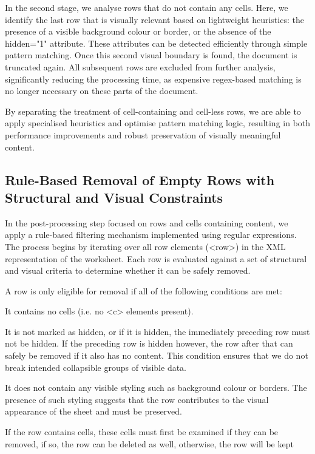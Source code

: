 In the second stage, we analyse rows that do not contain any cells.
Here, we identify the last row that is visually relevant based on lightweight heuristics:
the presence of a visible background colour or border,
or the absence of the hidden="1" attribute.
These attributes can be detected efficiently through simple pattern matching.
Once this second visual boundary is found, the document is truncated again.
All subsequent rows are excluded from further analysis,
significantly reducing the processing time,
as expensive regex-based matching is no longer necessary on these parts of the document.

By separating the treatment of cell-containing and cell-less rows,
we are able to apply specialised heuristics and optimise pattern matching logic,
resulting in both performance improvements
and robust preservation of visually meaningful content.

\subsection{Rule-Based Removal of Empty Rows with Structural and Visual Constraints}

In the post-processing step focused on rows and cells containing content,
we apply a rule-based filtering mechanism implemented using regular expressions.
The process begins by iterating over all row elements (<row>)
in the XML representation of the worksheet.
Each row is evaluated against a set of structural and visual criteria
to determine whether it can be safely removed.

A row is only eligible for removal if all of the following conditions are met:

It contains no cells (i.e. no <c> elements present).

It is not marked as hidden, or if it is hidden, the immediately preceding row must not be hidden. If the preceding row is hidden however, the row after that can safely be removed if it also has no content. This condition ensures that we do not break intended collapsible groups of visible data.

It does not contain any visible styling such as background colour or borders.
The presence of such styling suggests that the row contributes to the visual appearance of the sheet and must be preserved.

If the row contains cells, these cells must first be examined if they can be removed,
if so, the row can be deleted as well, otherwise, the row will be kept

